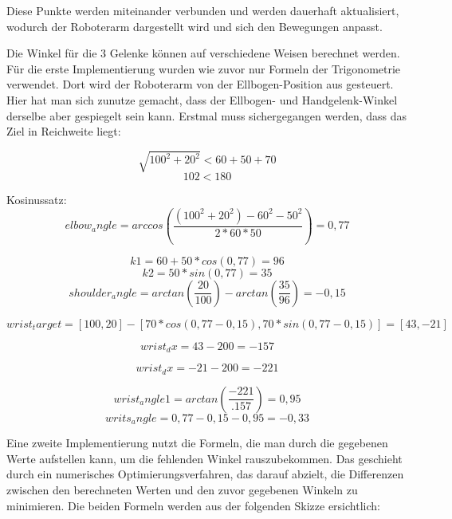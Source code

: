 \documentclass[12pt]{article}
\begin{document}
                    Diese Punkte werden miteinander verbunden und werden dauerhaft aktualisiert, wodurch der
                    Roboterarm dargestellt wird und sich den Bewegungen anpasst.

                    Die Winkel für die 3 Gelenke können auf verschiedene Weisen berechnet werden. Für die erste
                    Implementierung wurden wie zuvor nur Formeln der Trigonometrie verwendet. Dort wird der
                    Roboterarm von der Ellbogen-Position aus gesteuert. Hier hat man sich zunutze gemacht, dass
                    der Ellbogen- und Handgelenk-Winkel derselbe aber gespiegelt sein kann.
                    Erstmal muss sichergegangen werden, dass das Ziel in Reichweite liegt:

                    \[
                        \sqrt{100^2 + 20^2} < 60 + 50 +70
                    \]
                    \[
                        102 < 180
                    \]

                    Kosinussatz:
                    \[
                        elbow_angle = arccos(\frac{(100^2 +20^2)-60^2-50^2}{2*60*50}) = 0,77
                    \]

                    \[
                        k1 = 60 +50 * cos(0,77) = 96
                    \]
                    \[
                        k2 = 50*sin(0,77) = 35
                    \]
                    \[
                        shoulder_angle = arctan(\frac{20}{100}) - arctan(\frac{35}{96}) = -0,15
                    \]


                    \[
                        wrist_target = [100, 20] - [70 * cos(0,77 - 0,15), 70* sin(0,77 -0,15)] = [43, -21]
                    \]

                    \[
                        wrist_dx = 43 - 200 = -157
                    \]

                    \[
                        wrist_dx = -21 - 200 = -221
                    \]

                    \[
                        wrist_angle1 = arctan(\frac{-221}{.157})= 0,95
                    \]
                    \[
                        writs_angle = 0,77 -0,15 -0,95 = -0,33
                    \]

                    Eine zweite Implementierung nutzt die Formeln, die man durch die gegebenen Werte aufstellen kann, um die fehlenden
                    Winkel rauszubekommen. Das geschieht durch ein numerisches Optimierungsverfahren, das darauf abzielt, die Differenzen
                    zwischen den berechneten Werten und den zuvor gegebenen Winkeln zu minimieren.
                    Die beiden Formeln werden aus der folgenden Skizze ersichtlich:
\end{document}
